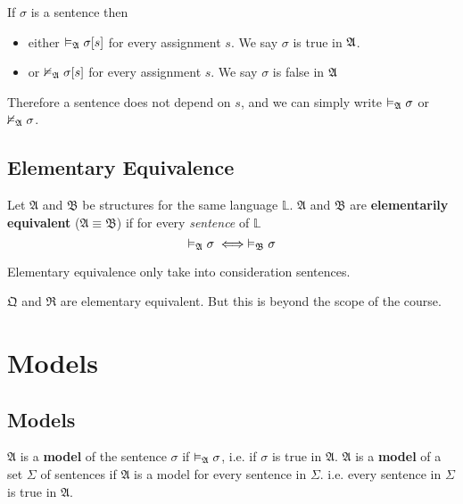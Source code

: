 \begin{corollary}
    If $\sigma$ is a sentence then
    \begin{itemize}
        \item either $\vDash_{\mathfrak{A}}\sigma[s]$ for every assignment $s$. We say $\sigma$ is true in $\mathfrak{A}$.
        \item or $\nvDash_{\mathfrak{A}}\sigma[s]$ for every assignment $s$. We say $\sigma$ is false in $\mathfrak{A}$
    \end{itemize}
\end{corollary}

Therefore a sentence does not depend on $s$, and we can simply write $\vDash_{\mathfrak{A}}\sigma$ or $\nvDash_{\mathfrak{A}}\sigma$.

\subsection{Elementary Equivalence}

\begin{definition}
    \label{def:ElementaryEquivalence}
    Let $\mathfrak{A}$ and $\mathfrak{B}$ be structures for the same language $\mathbb{L}$. $\mathfrak{A}$ and $\mathfrak{B}$ are \textbf{elementarily equivalent} ($\mathfrak{A} \equiv \mathfrak{B}$) if for every \emph{sentence} of $\mathbb{L}$
    \[ \vDash_{\mathfrak{A}}\sigma \iff \vDash_{\mathfrak{B}}\sigma \]
\end{definition}

\begin{remark}
    Elementary equivalence only take into consideration sentences.
\end{remark}

\begin{proposition}
    $\mathfrak{Q}$ and $\mathfrak{R}$ are elementary equivalent. But this is beyond the scope of the course.
\end{proposition}

\section{Models}

\subsection{Models}

\begin{definition}[Model]
    $\mathfrak{A}$ is a \textbf{model} of the sentence $\sigma$ if $\vDash_{\mathfrak{A}}\sigma$, i.e. if $\sigma$ is true in $\mathfrak{A}$. $\mathfrak{A}$ is a \textbf{model} of a set $\Sigma$ of sentences if $\mathfrak{A}$ is a model for every sentence in $\Sigma$. i.e. every sentence in $\Sigma$ is true in $\mathfrak{A}$.
\end{definition}

